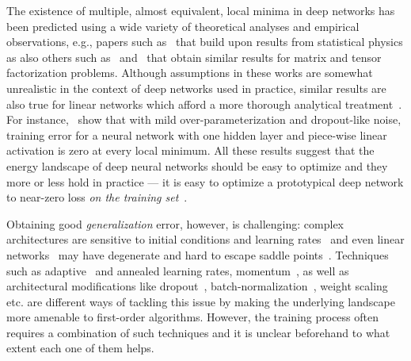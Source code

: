 \documentclass[10pt]{article}
\begin{document}
The existence of multiple, almost equivalent, local minima in deep networks has been predicted using a wide variety of theoretical analyses and empirical observations, e.g., papers such as~\citet{spinglass2015,DBLP:conf/colt/ChoromanskaLA15,chaudhari2015trivializing} that build upon results from statistical physics as also others such as~\citet{haeffele2015global} and~\citet{janzamin2015beating} that obtain similar results for matrix and tensor factorization problems. Although assumptions in these works are somewhat unrealistic in the context of deep networks used in practice, similar results are also true for linear networks which afford a more thorough analytical treatment~\citep{DBLP:journals/corr/SaxeMG13}. For instance,~\citet{soudry2016no} show that with mild over-parameterization and dropout-like noise, training error for a neural network with one hidden layer and piece-wise linear activation is zero at every local minimum. All these results suggest that the energy landscape of deep neural networks should be easy to optimize and they more or less hold in practice --- it is easy to optimize a prototypical deep network to near-zero loss \emph{on the training set}~\citep{hardt2015train,DBLP:journals/corr/GoodfellowV14}.

Obtaining good \emph{generalization} error, however, is challenging: complex architectures are sensitive to initial conditions and learning rates~\citep{sutskever2013importance} and even linear networks~\citep{kawaguchi2016deep} may have degenerate and hard to escape saddle points~\citep{ge2015escaping,anandkumar2016efficient}. Techniques such as adaptive~\citep{duchi2011adaptive} and annealed learning rates, momentum~\citep{tieleman2012lecture}, as well as architectural modifications like dropout~\citep{srivastava2014dropout}, batch-normalization~\citep{ioffe2015batch,cooijmans2016recurrent}, weight scaling~\citep{salimans2016weight} etc. are different ways of tackling this issue by making the underlying landscape more amenable to first-order algorithms. However, the training process often requires a combination of such techniques and it is unclear beforehand to what extent each one of them helps.
\end{document}
